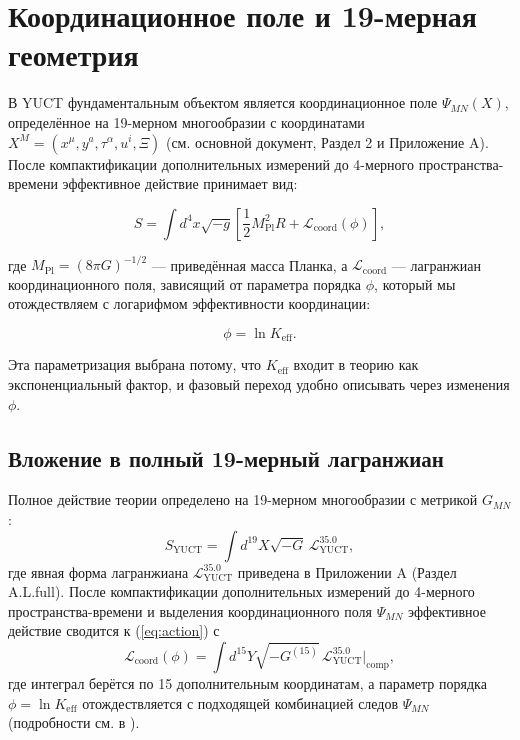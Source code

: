 \documentclass[12pt,a4paper]{article}
\theoremstyle{remark}
\newcommand{\Keff}{K_{\mathrm{eff}}}
\newcommand{\Mpl}{M_{\mathrm{Pl}}}
\begin{document}
	\section{Координационное поле и 19-мерная геометрия}
	\label{sec:field}
	
	В YUCT фундаментальным объектом является координационное поле $\Psi_{MN}(X)$, определённое на 19-мерном многообразии с координатами $X^M = (x^\mu, y^a, \tau^\alpha, u^i, \Xi)$ (см. основной документ, Раздел 2 и Приложение A). После компактификации дополнительных измерений до 4-мерного пространства-времени эффективное действие принимает вид:
	
	\begin{equation}
		S = \int d^4x \sqrt{-g} \left[ \frac{1}{2} \Mpl^2 R + \mathcal{L}_{\mathrm{coord}}(\phi) \right],
		\label{eq:action}
	\end{equation}
	
	где $\Mpl = (8\pi G)^{-1/2}$ — приведённая масса Планка, а $\mathcal{L}_{\mathrm{coord}}$ — лагранжиан координационного поля, зависящий от параметра порядка $\phi$, который мы отождествляем с логарифмом эффективности координации:
	
	\begin{equation}
		\phi = \ln \Keff.
		\label{eq:phi-def}
	\end{equation}
	
	Эта параметризация выбрана потому, что $\Keff$ входит в теорию как экспоненциальный фактор, и фазовый переход удобно описывать через изменения $\phi$.
	
	\subsection{Вложение в полный 19-мерный лагранжиан}
	
	Полное действие теории определено на 19-мерном многообразии с метрикой $G_{MN}$:
	\begin{equation}
		S_{\text{YUCT}} = \int d^{19}X \sqrt{-G} \, \mathcal{L}_{\text{YUCT}}^{35.0},
		\label{eq:full-action}
	\end{equation}
	где явная форма лагранжиана $\mathcal{L}_{\text{YUCT}}^{35.0}$ приведена в Приложении A (Раздел A.L.full). После компактификации дополнительных измерений до 4-мерного пространства-времени и выделения координационного поля $\Psi_{MN}$ эффективное действие сводится к (\ref{eq:action}) с
	\begin{equation}
		\mathcal{L}_{\mathrm{coord}}(\phi) = \int d^{15}Y \sqrt{-G^{(15)}} \, \mathcal{L}_{\text{YUCT}}^{35.0}\big|_{\text{comp}},
	\end{equation}
	где интеграл берётся по 15 дополнительным координатам, а параметр порядка $\phi = \ln\Keff$ отождествляется с подходящей комбинацией следов $\Psi_{MN}$ (подробности см. в \cite{Yakushev2026}).
	
\end{document}
